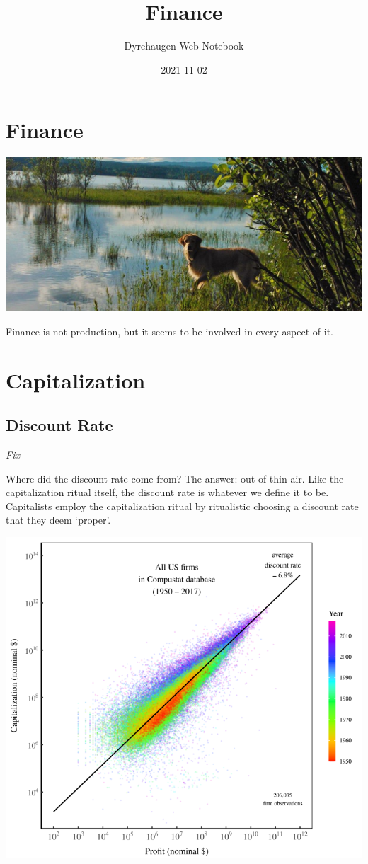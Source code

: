 \documentclass[
]{book}
\title{Finance}
\author{Dyrehaugen Web Notebook}
\date{2021-11-02}
\begin{document}
\maketitle

{
\setcounter{tocdepth}{1}
\tableofcontents
}
\hypertarget{finance}{%
\chapter{Finance}\label{finance}}

\includegraphics{fig/zelda.jpg}

Finance is not production, but it seems to be involved in every aspect of it.

\hypertarget{capitalization}{%
\chapter{Capitalization}\label{capitalization}}

\hypertarget{discount-rate}{%
\section{Discount Rate}\label{discount-rate}}

\emph{Fix}

Where did the discount rate come from? The answer: out of thin air. Like the capitalization ritual itself, the discount rate is whatever we define it to be. Capitalists employ the capitalization ritual by ritualistic choosing a discount rate that they deem `proper'.

\includegraphics{fig/profit_cap.png}
\end{document}
